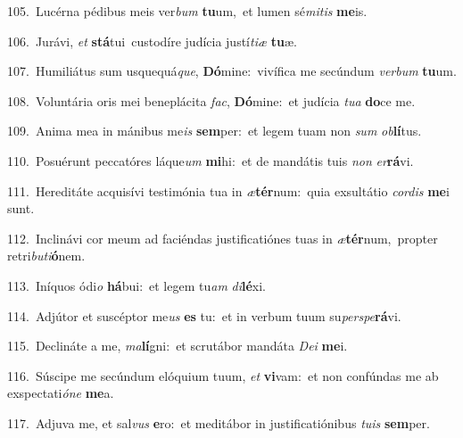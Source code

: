 {\numbfont\textcolor{\numbcolor}{105.}}~Lucérna pédibus meis ver\textit{bum} \textbf{tu}\-um,~\star et lumen sé\-\textit{mi}\-\textit{tis} \textbf{me}\-is.\par
{\numbfont\textcolor{\numbcolor}{106.}}~Jurávi, \textit{et} \textbf{stá}\-tui~\star custodíre judícia justí\-\textit{ti}\-\textit{æ} \textbf{tu}\-æ.\par
{\numbfont\textcolor{\numbcolor}{107.}}~Humiliátus sum usquequá\-\textit{que}\-, \textbf{Dó}\-mine:~\star vivífica me secúndum \textit{ver}\-\textit{bum} \textbf{tu}\-um.\par
{\numbfont\textcolor{\numbcolor}{108.}}~Voluntária oris mei beneplácita \textit{fac}\-, \textbf{Dó}\-mine:~\star et judícia \textit{tu}\-\textit{a} \textbf{do}\-ce me.\par
{\numbfont\textcolor{\numbcolor}{109.}}~Anima mea in mánibus me\textit{is} \textbf{sem}\-per:~\star et legem tuam non \textit{sum} \textit{ob}\-\textbf{lí}tus.\par
{\numbfont\textcolor{\numbcolor}{110.}}~Posuérunt peccatóres láque\textit{um} \textbf{mi}\-hi:~\star et de mandátis tuis \textit{non} \textit{er}\-\textbf{rá}vi.\par
{\numbfont\textcolor{\numbcolor}{111.}}~Hereditáte acquisívi testimónia tua in \textit{æ}\-\textbf{tér}num:~\star quia exsultátio \textit{cor}\-\textit{dis} \textbf{me}\-i sunt.\par
{\numbfont\textcolor{\numbcolor}{112.}}~Inclinávi cor meum ad faciéndas justificatiónes tuas in \textit{æ}\-\textbf{tér}num,~\star propter retri\-\textit{bu}\-\textit{ti}\textbf{ó}nem.\par
{\numbfont\textcolor{\numbcolor}{113.}}~Iníquos ódi\textit{o} \textbf{há}\-bui:~\star et legem tu\textit{am} \textit{di}\-\textbf{lé}xi.\par
{\numbfont\textcolor{\numbcolor}{114.}}~Adjútor et suscéptor me\textit{us} \textbf{es} tu:~\star et in verbum tuum su\-\textit{per}\-\textit{spe}\textbf{rá}vi.\par
{\numbfont\textcolor{\numbcolor}{115.}}~Declináte a me, \textit{ma}\-\textbf{lí}gni:~\star et scrutábor mandáta \textit{De}\-\textit{i} \textbf{me}\-i.\par
{\numbfont\textcolor{\numbcolor}{116.}}~Súscipe me secúndum elóquium tuum, \textit{et} \textbf{vi}\-vam:~\star et non confúndas me ab exspectati\-\textit{ó}\-\textit{ne} \textbf{me}\-a.\par
{\numbfont\textcolor{\numbcolor}{117.}}~Adjuva me, et sal\textit{vus} \textbf{e}\-ro:~\star et meditábor in justificatiónibus \textit{tu}\-\textit{is} \textbf{sem}\-per.\par
